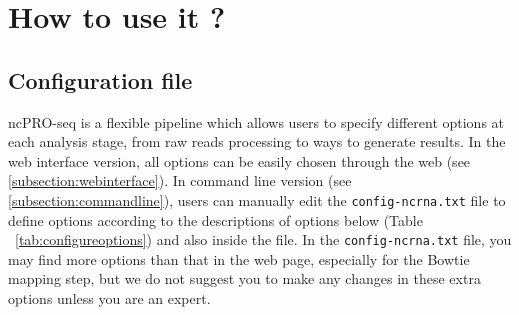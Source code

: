 \documentclass[12pt]{article}
\def \ncpip{ncPRO-seq}
\begin{document}
\section{How to use it ?}

\subsection{Configuration file}
\ncpip{} is a flexible pipeline which allows users to specify different options at each analysis stage, from raw reads processing to ways to generate results. In the web interface version, all options can be easily chosen through the web (see \ref{subsection:webinterface}). In command line version (see \ref{subsection:commandline}), users can manually edit the \verb+config-ncrna.txt+ file to define options according to the descriptions of options below (Table ~\ref{tab:configureoptions}) and also inside the file. In the \verb+config-ncrna.txt+ file, you may find more options than that in the web page, especially for the Bowtie mapping step, but we do not suggest you to make any changes in these extra options unless you are an expert.\\\\

\label{subsection:configure}
\end{document}
